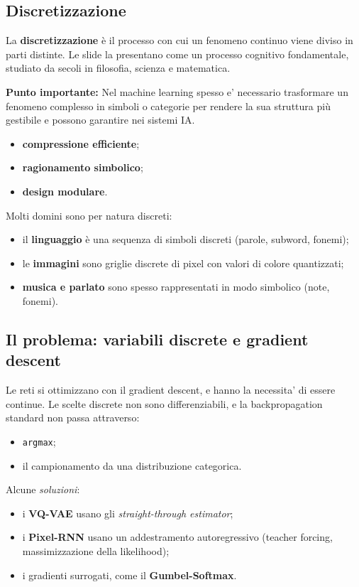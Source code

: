 \documentclass[11pt,a4paper]{article}
\begin{document}
\subsection{Discretizzazione}

La \textbf{discretizzazione} è il processo con cui un fenomeno continuo viene diviso in parti distinte. Le slide la 
presentano come un processo cognitivo fondamentale, studiato da secoli in filosofia, scienza e matematica.

\textbf{Punto importante:} Nel machine learning spesso e' necessario trasformare
un fenomeno complesso in simboli o categorie per rendere la sua struttura
più gestibile e possono garantire nei sistemi IA.

\begin{itemize}
  \item \textbf{compressione efficiente};
  \item \textbf{ragionamento simbolico};
  \item \textbf{design modulare}.
\end{itemize}

Molti domini sono per natura discreti:
\begin{itemize}
  \item il \textbf{linguaggio} è una sequenza di simboli discreti (parole, subword, fonemi);
  \item le \textbf{immagini} sono griglie discrete di pixel con valori di colore quantizzati;
  \item \textbf{musica e parlato} sono spesso rappresentati in modo simbolico (note, fonemi).
\end{itemize}

\subsection{Il problema: variabili discrete e gradient descent}

Le reti si ottimizzano con il gradient descent, e hanno la necessita' di essere continue. 
Le scelte discrete non sono differenziabili, e la backpropagation standard non passa attraverso:
\begin{itemize}
  \item \texttt{argmax};
  \item il campionamento da una distribuzione categorica.
\end{itemize}

Alcune \textit{soluzioni}:
\begin{itemize}
  \item i \textbf{VQ-VAE} usano gli \emph{straight-through estimator};
  \item i \textbf{Pixel-RNN} usano un addestramento autoregressivo (teacher forcing, massimizzazione della likelihood);
  \item i gradienti surrogati, come il \textbf{Gumbel-Softmax}.
\end{itemize}
\end{document}
